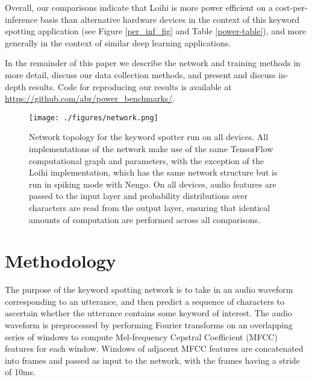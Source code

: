 \documentclass[sigconf, screen]{acmart}
\begin{document}
Overall, our comparisons indicate that Loihi is more power efficient on a cost-per-inference basis than alternative hardware devices in the context of this keyword spotting application (see Figure \ref{per_inf_fig} and Table \ref{power-table}), and more generally in the context of similar deep learning applications.

In the remainder of this paper we describe the network and training methods in more detail, discuss our data collection methods, and present and discuss in-depth results. Code for reproducing our results is available at \url{https://github.com/abr/power\_benchmarks/}.

\begin{figure}[!ht]
\centering
    \texttt{[image: ./figures/network.png]}
    \caption{Network topology for the keyword spotter run on all devices. All implementations of the network make use of the same TensorFlow computational graph and parameters, with the exception of the Loihi implementation, which has the same network structure but is run in spiking mode with Nengo. On all devices, audio features are passed to the input layer and probability distributions over characters are read from the output layer, ensuring that identical amounts of computation are performed across all comparisons.}
\label{network_fig}
\end{figure}

\section{Methodology}

The purpose of the keyword spotting network is to take in an audio waveform corresponding to an utterance, and then predict a sequence of characters to ascertain whether the utterance contains some keyword of interest. The audio waveform is preprocessed by performing Fourier transforms on an overlapping series of windows to compute Mel-frequency Cepstral Coefficient (MFCC) features for each window. Windows of adjacent MFCC features are concatenated into frames and passed as input to the network, with the frames having a stride of 10ms.  
\end{document}
